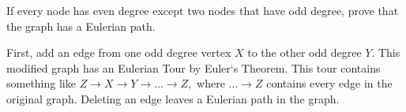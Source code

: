 \question If every node has even degree except two nodes that 
have odd degree, prove that the graph has a Eulerian path.

\begin{solution}
First, add an edge from one odd degree vertex $X$ to the other 
odd degree $Y$. This modified graph has an Eulerian Tour by Euler`s 
Theorem. This tour contains something like $Z \rightarrow X \rightarrow 
Y \rightarrow \dotsc \rightarrow Z,$ where $\dotsc \rightarrow Z$ 
contains every edge in the original graph. Deleting an edge leaves a 
Eulerian path in the graph. 
\end{solution}

\clearpage